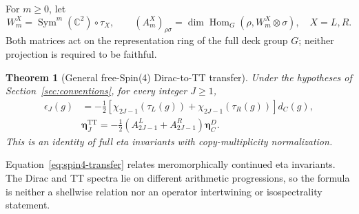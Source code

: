 \documentclass[11pt]{article}
\newtheorem{theorem}{Theorem}[section]
\theoremstyle{definition}
\DeclareMathOperator{\Sym}{Sym}
\DeclareMathOperator{\Hom}{Hom}
\newcommand{\TT}{\mathrm{TT}}
\newcommand{\C}{\mathbb C}
\begin{document}
For $m\geq0$, let
\begin{equation}
 W_m^X=\Sym^m(\C^2)\circ\tau_X,
 \qquad
 (A_m^X)_{\rho\sigma}
 =\dim\Hom_G(\rho,W_m^X\otimes\sigma),
 \quad X=L,R.
 \label{eq:spin4-representation-matrices}
\end{equation}
Both matrices act on the representation ring of the full deck group $G$;
neither projection is required to be faithful.

\begin{theorem}[General free-Spin(4) Dirac-to-TT transfer]
\label{thm:spin4-transfer}
Under the hypotheses of Section~\ref{sec:conventions}, for every integer
$J\geq1$,
\begin{align}
 \epsilon_J(g)
 &=-\frac12\left[
 \chi_{2J-1}(\tau_L(g))+\chi_{2J-1}(\tau_R(g))
 \right]d_C(g),
 \label{eq:spin4-class-transfer}\\
 &\boxed{\boldsymbol\eta^{\TT}_J
 =-\frac12\left(A^L_{2J-1}+A^R_{2J-1}\right)
 \boldsymbol\eta^D_C.}
 \label{eq:spin4-transfer}
\end{align}
This is an identity of full eta invariants with copy-multiplicity
normalization.
\end{theorem}

Equation~\eqref{eq:spin4-transfer} relates meromorphically continued eta
invariants.  The Dirac and TT spectra lie on different arithmetic
progressions, so the formula is neither a shellwise relation nor an operator
intertwining or isospectrality statement.
\end{document}
